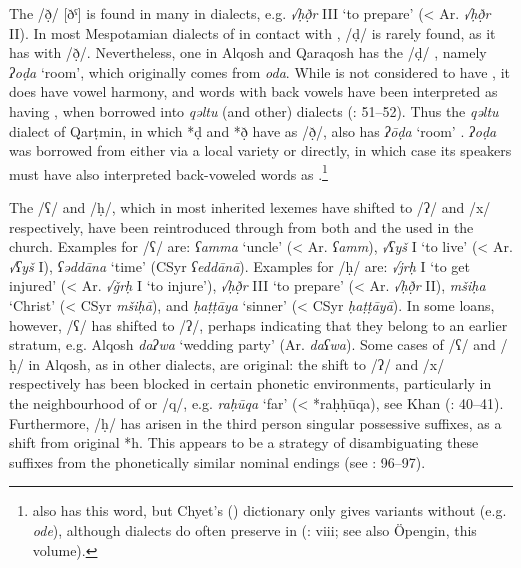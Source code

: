 \documentclass[output=paper]{langsci/langscibook}
\begin{document}
The   /ð̣/ [ðˤ] is found in many  in   dialects, e.g. \textit{√ḥð̣r} III ‘to prepare’ (<  Ar. \textit{√ḥð̣r} II). In most Mespotamian dialects of  in contact with , /ḍ/ is rarely found, as it has  with /ð̣/. Nevertheless, one  in Alqosh and Qaraqosh has the /ḍ/ , namely \textit{ʔoḍa} ‘room’, which originally comes from  \textit{oda}. While  is not considered to have , it does have vowel harmony, and words with back vowels have been interpreted as having , when borrowed into \textit{qəltu} (and other)  dialects (\citealt{Jastrow1978}: 51–52). Thus the \textit{qəltu} dialect of Qarṭmin, in which *ḍ and *ð̣ have  as /ð̣/, also has \textit{ʔōḍa} ‘room’ \citep[70]{Jastrow1978}.  \textit{ʔoḍa} was borrowed from  either via a local  variety or directly, in which case its speakers must have also interpreted back-voweled  words as .\footnote{  also has this word, but Chyet's (\citeyear{Chyet2003}) dictionary only gives variants without  (e.g. \textit{ode}), although   dialects do often preserve  in   (\citealt{Chyet2003}: viii; see also Öpengin, this volume).}

The  /ʕ/ and /ḥ/, which in most inherited  lexemes have shifted to /ʔ/ and /x/ respectively, have been reintroduced through  from both  and the   used in the church. Examples for /ʕ/ are: \textit{ʕamma} ‘uncle’ (< Ar. \textit{ʕamm}), \textit{√ʕyš} I ‘to live’ (< Ar. \textit{√ʕyš} I), \textit{ʕəddāna} ‘time’ (CSyr \textit{ʕeddānā}). Examples for /ḥ/ are: \textit{√jrḥ} I ‘to get injured’ (< Ar. \textit{√ǧrḥ} I ‘to injure’), \textit{√ḥð̣r} III ‘to prepare’ (<  Ar. \textit{√ḥð̣r} II), \textit{mšiḥa} ‘Christ’ (< CSyr \textit{mšiḥā}), and \textit{ḥaṭṭāya} ‘sinner’ (< CSyr \textit{ḥaṭṭāyā}). In some  loans, however, /ʕ/ has shifted to /ʔ/, perhaps indicating that they belong to an earlier stratum, e.g.  Alqosh \textit{daʔwa} ‘wedding party’ (Ar. \textit{daʕwa}). Some cases of /ʕ/ and /ḥ/ in Alqosh, as in other  dialects, are original: the shift to /ʔ/ and /x/ respectively has been blocked in certain phonetic environments, particularly in the neighbourhood of  or /q/, e.g. \textit{raḥūqa} ‘far’ (< *raḥḥūqa), see Khan (\citeyear{Khan2002}: 40–41). Furthermore, /ḥ/ has arisen in the third person singular possessive suffixes, as a shift from original *h. This appears to be a strategy of disambiguating these suffixes from the phonetically similar nominal endings (see \citealt{Coghill2008}: 96–97).
\end{document}
